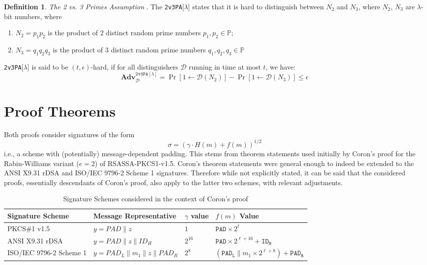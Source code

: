 \documentclass[]{final_report}
\theoremstyle{definition}
\newtheorem{definition}{Definition}[chapter]
\begin{document}
\begin{definition}
 \label{def:2v3}
\textit{The 2 vs. 3 Primes Assumption} \cite{jager2018security} . The \texttt{2v3PA}[$\lambda$] states that it is hard to distinguish between $N_2$ and $N_3$, where $N_2$, $N_3$ are $\lambda$-bit numbers, where 
\begin{enumerate}
\item $N_2 = p_1 p_2$ is the product of 2 distinct random prime numbers $p_1, p_2 \in \mathbb{P}$; 
\item $N_3 = q_1 q_2 q_3$ is the product of 3 distinct random prime numbers $q_1, q_2, q_3 \in \mathbb{P}$
\end{enumerate}
\texttt{2v3PA}[$\lambda$] is said to be $(t, \epsilon)$-hard, if for all distinguishers $\mathcal{D}$ running in time at most $t$, we have:
\[
\textbf{Adv}^{\texttt{2v3PA}[\lambda]}_\mathcal{D} = \Pr[1 \leftarrow \mathcal{D}(N_2)] - \Pr[1 \leftarrow \mathcal{D}(N_3)] \leqslant \epsilon
\]
\end{definition}

\section{Proof Theorems}
Both proofs consider signatures of the form \[ \sigma = (\gamma \cdot H(m) + f(m))^{1/2} \] i.e., a scheme with (potentially) message-dependent padding. This stems from theorem statements used initially by Coron's proof \cite{coron2002security} for the Rabin-Williams variant (\( e = 2 \)) of RSASSA-PKCS1-v1.5. Coron's theorem statements were general enough to indeed be extended to the ANSI X9.31 rDSA and ISO/IEC 9796-2 Scheme 1 signatures. Therefore while not explicitly stated, it can be said that the considered proofs, essentially descendants of Coron's proof, also apply to the latter two schemes, with relevant adjustments.
\begin{table}[H]

\begin{tabular}{|m{4.38cm}|m{5cm}|m{1.5cm}|m{4cm}|}
\hline
\textbf{Signature Scheme} & \textbf{Message Representative} & \textbf{$\gamma$ value} & \textbf{\( f(m) \) Value} \\ \hline
PKCS\#1 v1.5              & \( y = PAD  \| z \)      & \(1\) & \( \texttt{PAD} \times 2^{\ell} \) \\ \hline
ANSI X9.31 rDSA           & \( y = PAD  \| z \| ID_{H} \)          & \( 2^{16} \)     & \( \texttt{PAD} \times 2^{\ell + 16} + \texttt{ID}_{\texttt{H}} \)     \\ \hline
ISO/IEC 9796-2 Scheme 1   & \( y = PAD_{L} \| m_{1} \| z \| PAD_{R} \)            & \( 2^{8} \)       & \( (\texttt{PAD}_{\texttt{L}} \| m_{1} \times 2^{\ell + 8}) + \texttt{PAD}_{\texttt{R}} \)       \\ \hline
\end{tabular}
\caption{Signature Schemes considered in the context of Coron's proof \cite{coron2002security}}
\label{table:coron}
\end{table}
\end{document}
